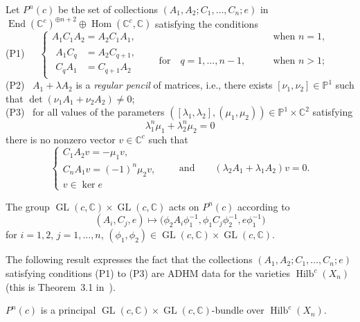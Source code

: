 Let $P^{n}(c)$ be the set of collections $(A_1,A_2;C_1,\dots,C_{n};e)$
in $\operatorname{End}(\mathbb{C}^{c})^{\oplus n+2}\oplus\operatorname{Hom}(\mathbb{C}^{c},\mathbb{C})$ sa\-tisfying the conditions\\[8pt]
(P1)\ \ \
$\displaystyle
\begin{cases}
A_1C_1A_{2}=A_2C_{1}A_{1},&\qquad\text{when $n=1$},\\[2pt]
\begin{aligned}
A_1C_q&=A_2C_{q+1},\\
C_qA_1&=C_{q+1}A_2
\end{aligned}
\qquad\text{for}\quad q=1,\dots,n-1,&\qquad\text{when $n>1$;}
\end{cases}
$
\\[8pt]
(P2) \
$A_1+\lambda A_2$ is a \emph{regular pencil} of matrices, i.e., there exists $[\nu_{1},\nu_{2}]\in\mathbb{P}^1$ such that $\det(\nu_1A_1+\nu_2A_2)\neq0$;
\\[8pt]
(P3) \
for all values of the parameters $ ([\lambda_1,\lambda_2],(\mu_1,\mu_{2}) )\in\mathbb{P}^1\times\mathbb{C}^{2}$ satisfying
\begin{equation*}
\lambda_{1}^{n}\mu_{1}+\lambda_{2}^{n}\mu_{2}=0
\end{equation*}
there is no nonzero vector $v\in\mathbb{C}^c$ such that
\begin{equation*}
\begin{cases}
C_{1}A_{2}v=-\mu_1v,\\
C_{n}A_{1}v=(-1)^n\mu_2v,\\
v\in\ker e
\end{cases}
\qquad\text{and}\qquad\left(\lambda_2{A_1}+\lambda_1{A_2}\right)v=0 .
\end{equation*}

The group
$\operatorname{GL}(c, \mathbb{C})\times \operatorname{GL}(c, \mathbb{C})$ acts on $P^n(c)$ according to
\begin{equation*} (A_i, C_j, e ) \mapsto \big(\phi_2A_i\phi_1^{-1},\phi_1C_j\phi_2^{-1}, e\phi_1^{-1}\big)
\end{equation*}
for $i=1,2$, $j=1,\dots,n$, $ (\phi_1,\phi_2)\in\operatorname{GL}(c, \mathbb{C})\times \operatorname{GL}(c, \mathbb{C})$.

 The following result expresses the fact that the collections $(A_1,A_2;C_1,\dots,C_{n};e)$ satisfying
 conditions (P1) to (P3) are ADHM data for the varieties $\operatorname{Hilb}^c (X_{n})$ (this is Theorem~3.1 in~\cite{bbr}).
 \begin{Theorem}\label{thm0}
$P^{n}(c)$ is a principal $\operatorname{GL}(c, \mathbb{C})\times \operatorname{GL}(c, \mathbb{C})$-bundle over $\operatorname{Hilb}^c (X_{n})$.
\end{Theorem}

